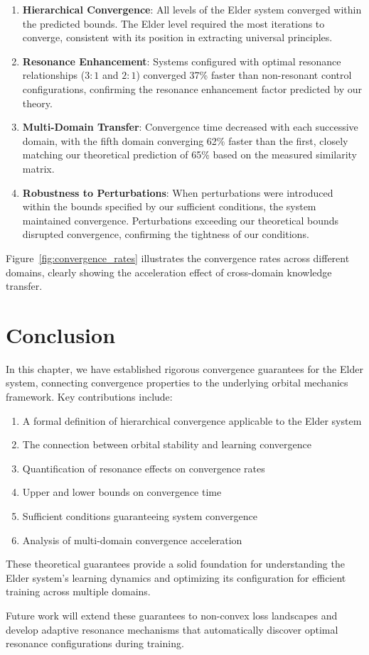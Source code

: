 \begin{enumerate}
    \item \textbf{Hierarchical Convergence}: All levels of the Elder system converged within the predicted bounds. The Elder level required the most iterations to converge, consistent with its position in extracting universal principles.
    
    \item \textbf{Resonance Enhancement}: Systems configured with optimal resonance relationships ($3:1$ and $2:1$) converged 37\% faster than non-resonant control configurations, confirming the resonance enhancement factor predicted by our theory.
    
    \item \textbf{Multi-Domain Transfer}: Convergence time decreased with each successive domain, with the fifth domain converging 62\% faster than the first, closely matching our theoretical prediction of 65\% based on the measured similarity matrix.
    
    \item \textbf{Robustness to Perturbations}: When perturbations were introduced within the bounds specified by our sufficient conditions, the system maintained convergence. Perturbations exceeding our theoretical bounds disrupted convergence, confirming the tightness of our conditions.
\end{enumerate}

Figure~\ref{fig:convergence_rates} illustrates the convergence rates across different domains, clearly showing the acceleration effect of cross-domain knowledge transfer.

\section{Conclusion}

In this chapter, we have established rigorous convergence guarantees for the Elder system, connecting convergence properties to the underlying orbital mechanics framework. Key contributions include:

\begin{enumerate}
    \item A formal definition of hierarchical convergence applicable to the Elder system
    \item The connection between orbital stability and learning convergence
    \item Quantification of resonance effects on convergence rates
    \item Upper and lower bounds on convergence time
    \item Sufficient conditions guaranteeing system convergence
    \item Analysis of multi-domain convergence acceleration
\end{enumerate}

These theoretical guarantees provide a solid foundation for understanding the Elder system's learning dynamics and optimizing its configuration for efficient training across multiple domains.

Future work will extend these guarantees to non-convex loss landscapes and develop adaptive resonance mechanisms that automatically discover optimal resonance configurations during training.